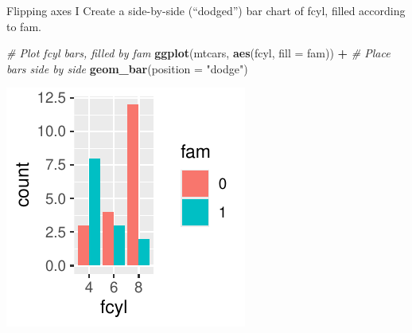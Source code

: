 \documentclass[
  ignorenonframetext,
]{beamer}
\newenvironment{Shaded}{\begin{snugshade}}{\end{snugshade}}
\newcommand{\AttributeTok}[1]{\textcolor[rgb]{0.13,0.29,0.53}{#1}}
\newcommand{\CommentTok}[1]{\textcolor[rgb]{0.56,0.35,0.01}{\textit{#1}}}
\newcommand{\FunctionTok}[1]{\textcolor[rgb]{0.13,0.29,0.53}{\textbf{#1}}}
\newcommand{\NormalTok}[1]{#1}
\newcommand{\SpecialCharTok}[1]{\textcolor[rgb]{0.81,0.36,0.00}{\textbf{#1}}}
\newcommand{\StringTok}[1]{\textcolor[rgb]{0.31,0.60,0.02}{#1}}
\begin{document}
\begin{frame}[fragile]{Flipping axes I}
\label{flipping-axes-i-2}
Create a side-by-side (``dodged'') bar chart of fcyl, filled according
to fam.


\begin{Shaded}
\begin{Highlighting}[]
\CommentTok{\# Plot fcyl bars, filled by fam}
\FunctionTok{ggplot}\NormalTok{(mtcars, }\FunctionTok{aes}\NormalTok{(fcyl, }\AttributeTok{fill =}\NormalTok{ fam)) }\SpecialCharTok{+} \CommentTok{\# Place bars side by side}
  \FunctionTok{geom\_bar}\NormalTok{(}\AttributeTok{position =} \StringTok{"dodge"}\NormalTok{)}
\end{Highlighting}
\end{Shaded}

\begin{center}\includegraphics[width=0.5\linewidth]{Figs/unnamed-chunk-59-1} \end{center}
\end{frame}
\end{document}
